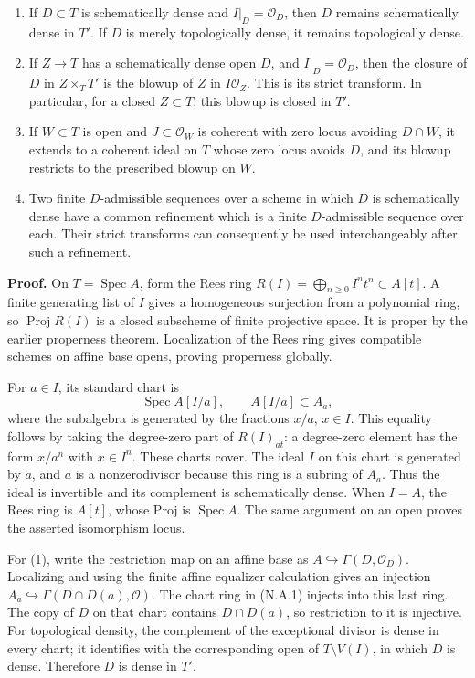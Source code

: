 \documentclass[11pt]{article}
\providecommand{\tightlist}{\setlength{\itemsep}{0pt}\setlength{\parskip}{0pt}}
\begin{document}
\begin{enumerate}
\def\labelenumi{\arabic{enumi}.}
\tightlist
\item
  If \(D\subset T\) is schematically dense and \(I|_D=\mathcal O_D\),
  then \(D\) remains schematically dense in \(T'\). If \(D\) is merely
  topologically dense, it remains topologically dense.
\item
  If \(Z\to T\) has a schematically dense open \(D\), and
  \(I|_D=\mathcal O_D\), then the closure of \(D\) in \(Z\times_T T'\)
  is the blowup of \(Z\) in \(I\mathcal O_Z\). This is its strict
  transform. In particular, for a closed \(Z\subset T\), this blowup is
  closed in \(T'\).
\item
  If \(W\subset T\) is open and \(J\subset\mathcal O_W\) is coherent
  with zero locus avoiding \(D\cap W\), it extends to a coherent ideal
  on \(T\) whose zero locus avoids \(D\), and its blowup restricts to
  the prescribed blowup on \(W\).
\item
  Two finite \(D\)-admissible sequences over a scheme in which \(D\) is
  schematically dense have a common refinement which is a finite
  \(D\)-admissible sequence over each. Their strict transforms can
  consequently be used interchangeably after such a refinement.
\end{enumerate}

\textbf{Proof.} On \(T=\operatorname{Spec}A\), form the Rees ring
\(R(I)=\bigoplus_{n\geq0}I^n t^n\subset A[t]\). A finite generating list
of \(I\) gives a homogeneous surjection from a polynomial ring, so
\(\operatorname{Proj}R(I)\) is a closed subscheme of finite projective
space. It is proper by the earlier properness theorem. Localization of
the Rees ring gives compatible schemes on affine base opens, proving
properness globally.

For \(a\in I\), its standard chart is \[
\operatorname{Spec}A[I/a],\qquad
A[I/a]\subset A_a,
\tag{N.A.1}
\] where the subalgebra is generated by the fractions \(x/a\),
\(x\in I\). This equality follows by taking the degree-zero part of
\(R(I)_{at}\): a degree-zero element has the form \(x/a^n\) with
\(x\in I^n\). These charts cover. The ideal \(I\) on this chart is
generated by \(a\), and \(a\) is a nonzerodivisor because this ring is a
subring of \(A_a\). Thus the ideal is invertible and its complement is
schematically dense. When \(I=A\), the Rees ring is \(A[t]\), whose Proj
is \(\operatorname{Spec}A\). The same argument on an open proves the
asserted isomorphism locus.

For (1), write the restriction map on an affine base as
\(A\hookrightarrow\Gamma(D,\mathcal O_D)\). Localizing and using the
finite affine equalizer calculation gives an injection
\(A_a\hookrightarrow\Gamma(D\cap D(a),\mathcal O)\). The chart ring in
(N.A.1) injects into this last ring. The copy of \(D\) on that chart
contains \(D\cap D(a)\), so restriction to it is injective. For
topological density, the complement of the exceptional divisor is dense
in every chart; it identifies with the corresponding open of
\(T\setminus V(I)\), in which \(D\) is dense. Therefore \(D\) is dense
in \(T'\).
\end{document}
